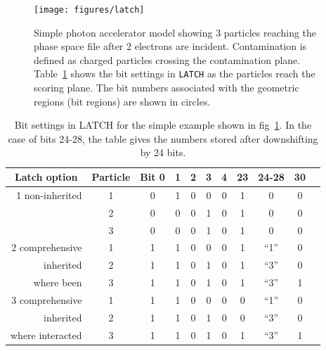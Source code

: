 \documentclass[12pt,twoside]{article}
\begin{document}
\begin{figure}[H]
\vspace*{-0.3cm}
\begin{center}
\leavevmode
\mbox{}\hspace{0cm}
\texttt{[image: figures/latch]}
\caption[Example of LATCH settings.]
{Simple photon accelerator model showing 3 particles reaching
the phase space file after 2 electrons are incident.  Contamination is
defined as charged particles crossing the contamination plane.
Table~\ref{table_latch} shows the bit settings in {\tt LATCH} as the particles
reach the scoring plane. The bit numbers associated with the geometric regions
(bit regions) are shown in circles.}
\label{fig_latch}
\end{center}
\end{figure}
\begin{table}[H]
\vspace*{-1cm}
\begin{center}
\caption{Bit settings in LATCH for the simple example shown in
fig~\ref{fig_latch}.  In the
case of bits 24-28, the table gives the numbers stored after downshifting by 24 bits.}
\label{table_latch}
\begin{tabular}{|r|c|ccccccc|c|c|}
\hline
\multicolumn{1}{|c}{Latch option} &
\multicolumn{1}{|c}{Particle} &
\multicolumn{1}{|c}{Bit 0} &
\multicolumn{1}{c}{1} &
\multicolumn{1}{c}{2} &
\multicolumn{1}{c}{3} &
\multicolumn{1}{c}{4} &
\multicolumn{1}{c}{23} &
\multicolumn{1}{c}{24-28} &
\multicolumn{1}{c|}{30}\\
\hline
1 non-inherited & 1 & 0 & 1 & 0 & 0 & 0 & 1 & 0 & 0\\
~~~             & 2 & 0 & 0 & 0 & 1 & 0 & 1 & 0 & 0\\
~~~~~~~         & 3 & 0 & 0 & 0 & 1 & 0 & 1 & 0 & 0\\
\hline
2 comprehensive & 1 & 1 & 1 & 0 & 0 & 0 & 1 & ``1'' & 0\\
inherited       & 2 & 1 & 1 & 0 & 1 & 0 & 1 & ``3'' & 0\\
where been      & 3 & 1 & 1 & 0 & 1 & 0 & 1 & ``3'' & 1\\
\hline
3 comprehensive & 1 & 1 & 1 & 0 & 0 & 0 & 0 & ``1'' & 0\\
inherited       & 2 & 1 & 1 & 0 & 1 & 0 & 0 & ``3'' & 0\\
where interacted & 3 & 1 & 1 & 0 & 1 & 0 & 1 & ``3'' & 1\\
\hline
\end{tabular}
\end{center}
\end{table}
\end{document}
